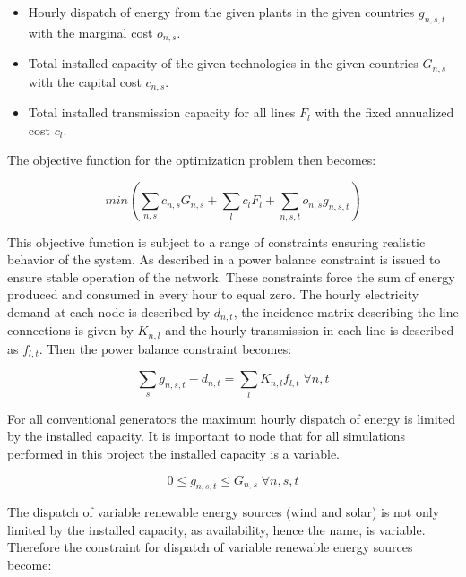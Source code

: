 \begin{itemize}
	\item Hourly dispatch of energy from the given plants in the given countries $g_{n,s,t}$ with the marginal cost $o_{n,s}$.
	\item Total installed capacity of the given technologies in the given countries $G_{n,s}$ with the capital cost $c_{n,s}$.
	\item Total installed transmission capacity for all lines $F_{l}$ with the fixed annualized cost $c_{l}$.
	
\end{itemize}

The objective function for the optimization problem then becomes: 

\begin{equation}
min \left( \sum_{n,s} c_{n,s} G_{n,s} + \sum_l c_l F_l + \sum_{n,s,t} o_{n,s} g_{n,s,t} \right)
\end{equation}{}

This objective function is subject to a range of constraints ensuring realistic behavior of the system. As described in \cite{PyPSA_euro_30_model} a power balance constraint is issued to ensure stable operation of the network. These constraints force the sum of energy produced and consumed in every hour to equal zero. The hourly electricity demand at each node is described by $d_{n,t}$, the incidence matrix describing the line connections is given by $K_{n,l}$ and the hourly transmission in each line is described as $f_{l,t}$. Then the power balance constraint becomes:

\begin{equation}
\sum_s g_{n,s,t} - d_{n,t} = \sum_l K_{n,l} f_{l,t} \; \forall n,t
\end{equation}

For all conventional generators the maximum hourly dispatch of energy is limited by the installed capacity. It is important to node that for all simulations performed in this project the installed capacity is a variable. 

\begin{equation}
0\leq g_{n,s,t} \leq G_{n,s} \; \forall n,s,t
\end{equation}

The dispatch of variable renewable energy sources (wind and solar) is not only limited by the installed capacity, as availability, hence the name, is variable. Therefore the constraint for dispatch of variable renewable energy sources become:

